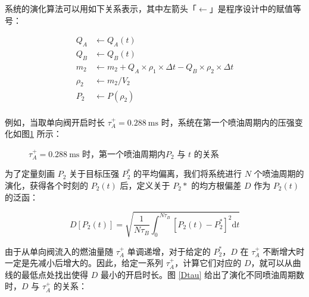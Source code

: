 \documentclass[withoutpreface,bwprint]{cumcmthesis}
\newcommand{\tim}{~\mathrm{ms}}
\newcommand{\pres}{/\mathrm{kPa}}
\newcommand{\tims}{/\mathrm{ms}}
\begin{document}
系统的演化算法可以用如下关系表示，其中左箭头「$\leftarrow$」是程序设计中的赋值等号：

$$
\begin{aligned}
    Q_A &\leftarrow Q_A(t)\\
    Q_B &\leftarrow Q_B(t)\\
    m_2 &\leftarrow m_2 + Q_A \times \rho_1 \times \Delta t - Q_B \times \rho_2 \times \Delta t\\
    \rho_2 &\leftarrow m_2 / V_2\\
    P_2 &\leftarrow P(\rho_2)\\
\end{aligned}
$$

例如，当取单向阀开启时长 $\tau_A^+=0.288\tim$ 时，系统在第一个喷油周期内的压强变化如图\ref{firstperiodPt} 所示：

\begin{figure}[!ht]
	\centering
	\caption{$\tau_A^+=0.288\tim$ 时，第一个喷油周期内$P_2$ 与 $t$ 的关系}
	\label{firstperiodPt}
\end{figure}

为了定量刻画 $P_2$ 关于目标压强 $P_2^*$ 的平均偏离，我们将系统进行 $N$ 个喷油周期的演化，获得各个时刻的 $P_2(t)$ 后，定义关于 $P_2*$ 的均方根偏差 $D$ 作为 $P_2(t)$ 的泛函：

$$
D[P_2(t)]=\sqrt{\frac1{N\tau_B}\int_0^{N\tau_B}
\left[P_2(t)-P_2^*\right]^2\mathrm dt}
$$

由于从单向阀流入的燃油量随 $\tau_A^+$ 单调递增，对于给定的 $P_2^*$，$D$ 在 $\tau_A^+$ 不断增大时一定是先减小后增大的。因此，给定一系列 $\tau_A^+$，计算它们对应的 $D$，就可以从曲线的最低点处找出使得 $D$ 最小的开启时长。图 \ref{Dtau} 给出了演化不同喷油周期数时，$D$ 与 $\tau_A^+$ 的关系：
\end{document}
